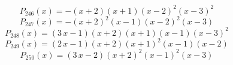 \subitem \begin{dmath*}P_{246}(x) = -{\left(x + 2\right)} {\left(x + 1\right)} {\left(x - 2\right)}^{2} {\left(x - 3\right)}^{2} \end{dmath*}\vspace{-1.2cm}
\subitem \begin{dmath*}P_{247}(x) = -{\left(x + 2\right)}^{2} {\left(x - 1\right)} {\left(x - 2\right)}^{2} {\left(x - 3\right)} \end{dmath*}\vspace{-1.2cm}
\subitem \begin{dmath*}P_{248}(x) = {\left(3 \, x - 1\right)} {\left(x + 2\right)} {\left(x + 1\right)} {\left(x - 1\right)} {\left(x - 3\right)}^{2} \end{dmath*}\vspace{-1.2cm}
\subitem \begin{dmath*}P_{249}(x) = {\left(2 \, x - 1\right)} {\left(x + 2\right)} {\left(x + 1\right)}^{2} {\left(x - 1\right)} {\left(x - 2\right)} \end{dmath*}\vspace{-1.2cm}
\subitem \begin{dmath*}P_{250}(x) = {\left(3 \, x - 2\right)} {\left(x + 2\right)}^{2} {\left(x - 1\right)}^{2} {\left(x - 3\right)} \end{dmath*}\vspace{-1.2cm}

